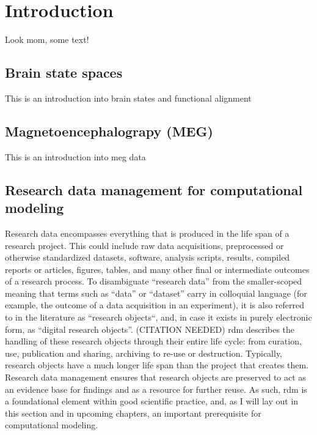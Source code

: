 
\chapter{Introduction}
\label{chap:k1}

Look mom, some text!

\section{Brain state spaces}
This is an introduction into brain states and functional alignment
\pagebreak

\section{Magnetoencephalograpy (MEG)}
This is an introduction into \gls{meg} data
\pagebreak

\section{Research data management for computational modeling}

Research data encompasses everything that is produced in the life span of a research project.
This could include raw data acquisitions, preprocessed or otherwise standardized datasets, software, analysis scripts, results, compiled reports or articles, figures, tables, and many other final or intermediate outcomes of a research process.
To disambiguate ``research data'' from the smaller-scoped meaning that terms such as ``data'' or ``dataset'' carry in colloquial language (for example, the outcome of a data acquisition in an experiment), it is also referred to in the literature as ``research objects``, and, in case it exists in purely electronic form, as ``digital research objects''. (CITATION NEEDED)
\gls{rdm} describes the handling of these research objects through their entire life cycle: from curation, use, publication and sharing, archiving to re-use or destruction.
Typically, research objects have a much longer life span than the project that creates them.
Research data management ensures that research objects are preserved to act as an evidence base for findings and as a resource for further reuse.
As such, \gls{rdm} is a foundational element within good scientific practice, and, as I will lay out in this section and in upcoming chapters, an important prerequisite for computational modeling.


